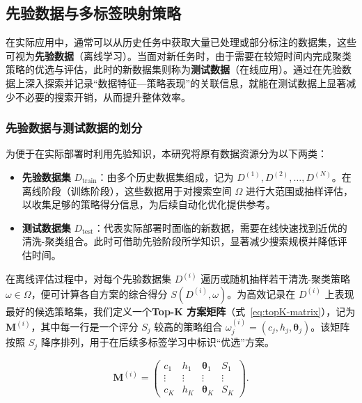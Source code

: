\documentclass[10pt]{article} %
\numberwithin{equation}{section}
\begin{document}
\subsection{先验数据与多标签映射策略}
\label{sec:prior-data-mapping}

在实际应用中，通常可以从历史任务中获取大量已处理或部分标注的数据集，这些可视为\textbf{先验数据}（离线学习）。当面对新任务时，由于需要在较短时间内完成聚类策略的优选与评估，此时的新数据集则称为\textbf{测试数据}（在线应用）。通过在先验数据上深入探索并记录“数据特征—策略表现”的关联信息，就能在测试数据上显著减少不必要的搜索开销，从而提升整体效率。

\subsubsection{先验数据与测试数据的划分}
\label{subsec:dataset-split}

为便于在实际部署时利用先验知识，本研究将原有数据资源分为以下两类：
\begin{itemize}
    \item \textbf{先验数据集} $D_{\text{train}}$：由多个历史数据集组成，记为 ${D^{(1)}, D^{(2)}, \dots, D^{(N)}}$。在离线阶段（训练阶段），这些数据用于对搜索空间 $\Omega$ 进行大范围或抽样评估，以收集足够的策略得分信息，为后续自动化优化提供参考。
    \item \textbf{测试数据集} $D_{\text{test}}$：代表实际部署时面临的新数据，需要在线快速找到近优的清洗-聚类组合。此时可借助先验阶段所学知识，显著减少搜索规模并降低评估时间。
\end{itemize}

在离线评估过程中，对每个先验数据集 $D^{(i)}$ 遍历或随机抽样若干清洗-聚类策略 $\omega \in \Omega$，便可计算各自方案的综合得分 $S(D^{(i)}, \omega)$。为高效记录在 $D^{(i)}$ 上表现最好的候选策略集，我们定义一个\textbf{Top-K 方案矩阵}（式~\eqref{eq:topK-matrix}），记为 $\mathbf{M}^{(i)}$，其中每一行是一个评分 $S_j$ 较高的策略组合 $\omega_j^{(i)}=(c_j,h_j,\boldsymbol{\theta}_j)$。该矩阵按照 $S_j$ 降序排列，用于在后续多标签学习中标识“优选”方案。

\begin{equation}\label{eq:topK-matrix}
\mathbf{M}^{(i)} 
= 
\begin{pmatrix}
c_1 & h_1 & \boldsymbol{\theta}_1 & S_1 \\
\vdots & \vdots & \vdots & \vdots \\
c_K & h_K & \boldsymbol{\theta}_K & S_K
\end{pmatrix}.
\end{equation}
\end{document}

